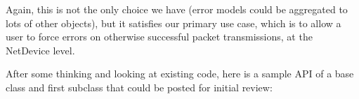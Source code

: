 \documentclass[letterpaper,10pt,english]{sphinxmanual}
\begin{document}
Again, this is not the only choice we have (error models could be aggregated to
lots of other objects), but it satisfies our primary use case, which is to allow
a user to force errors on otherwise successful packet transmissions, at the
NetDevice level.

After some thinking and looking at existing  code, here is a sample API of
a base class and first subclass that could be posted for initial review:

\begin{sphinxVerbatim}[commandchars=\\\{\}]
 
   
    
     
    
    
    
     
        
       

 


\end{sphinxVerbatim}
\end{document}
